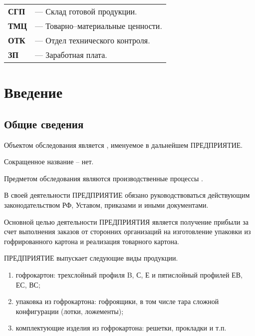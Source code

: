 \begin{tabular}{l l}

{\bf СГП}  & --- Склад готовой продукции.\\
{\bf ТМЦ}  & --- Товарно--материальные ценности.\\
{\bf ОТК}  & --- Отдел технического контроля.\\

{\bf ЗП}  & --- Заработная плата.\\

\end{tabular}


\newpage

\chapter{Введение}

\section{Общие сведения}

Объектом обследования является \FIRMA, именуемое в дальнейшем ПРЕДПРИЯТИЕ.

Сокращенное название -- нет.

Предметом обследования являются производственные процессы \FIRMA. 


В своей деятельности ПРЕДПРИЯТИЕ обязано руководствоваться действующим законодательством РФ, Уставом, приказами и иными документами.

Основной целью деятельности ПРЕДПРИЯТИЯ является получение прибыли за счет выполнения заказов от сторонних организаций на изготовление упаковки из гофрированного картона и реализация товарного картона. 


ПРЕДПРИЯТИЕ выпускает следующие виды продукции.
\begin{enumerate}
    \item гофрокартон: трехслойный профиля B, С, Е и пятислойный профилей ЕВ, ЕС, ВС;
	\item упаковка из гофрокартона: гофроящики, в том числе тара сложной конфигурации (лотки, ложементы);
	\item комплектующие изделия из гофрокартона: решетки, прокладки и т.п.
\end{enumerate}

